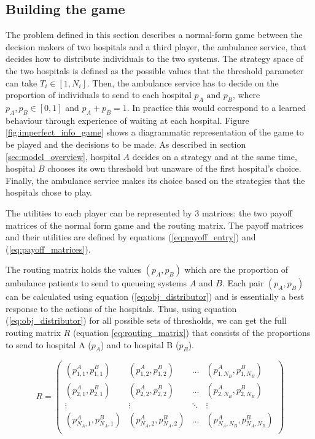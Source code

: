 \subsection{Building the game}\label{sec:methodology}

The problem defined in this section describes a normal-form
game between the decision makers of two hospitals and a third player, the 
ambulance service, that 
decides how to distribute individuals to the two systems.
The strategy space of the two hospitals is defined as the possible values
that the threshold parameter can take \(T_i \in [1, N_i]\).
Then, the ambulance service has to decide on the proportion of individuals to 
send to 
each hospital \(p_A \text{ and } p_B\), where \(p_A, p_B \in [0, 1] \)
and \(p_A + p_B = 1\).
In practice this would correspond to a learned behaviour through experience of
waiting at each hospital.
Figure \ref{fig:imperfect_info_game} 
shows a diagrammatic representation of the game to be played and the decisions 
to be made.
As described in section \ref{sec:model_overview}, hospital \(A\) decides
on a strategy and at the same time, hospital \(B\) chooses its own 
threshold but unaware of the first hospital's choice.
Finally, the ambulance service makes its choice based on the strategies that the 
hospitals chose to play. 

The utilities to each player can be represented by 3 matrices: the two payoff 
matrices of the normal form game and the routing matrix.
The payoff matrices and their utilities are defined by equations 
(\ref{eq:payoff_entry}) and (\ref{eq:payoff_matrices}).

The routing matrix holds the values \((p_A, p_B)\) which are the proportion 
of ambulance patients to send to queueing systems \(A\) and \(B\).
Each pair \((p_A, p_B)\) can be calculated using equation 
(\ref{eq:obj_distributor}) and is essentially
a best response to the actions of the hospitals.
Thus, using equation (\ref{eq:obj_distributor}) for all possible sets of 
thresholds, we can get the full routing matrix \(R\) (equation
\ref{eq:routing_matrix})
that consists of the proportions
to send to hospital A (\(p_A\)) and to hospital B (\(p_B\)).

\begin{equation}\label{eq:routing_matrix}
    R = 
    \begin{pmatrix}
        (p_{1,1}^A, p_{1,1}^B) & (p_{1,2}^A, p_{1,2}^B) & \dots & 
        (p_{1,N_B}^A, p_{1,N_B}^B) \\
        (p_{2,1}^A, p_{2,1}^B) & (p_{2,2}^A, p_{2,2}^B) & \dots & 
        (p_{2,N_B}^A, p_{2,N_B}^B) \\
        \vdots & \vdots & \ddots & \vdots \\
        (p_{N_A,1}^A, p_{N_A,1}^B) & (p_{N_A,2}^A, p_{N_A,2}^B) & \dots & 
        (p_{N_A,N_B}^A, p_{N_A,N_B}^B) \\
    \end{pmatrix}
\end{equation}

